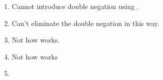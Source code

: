 \begin{enumerate}
\begin{enumerate}
\item 
\begin{argumentN}[1]



\end{argumentN}


\opts{

 \dotline
 \dotline
}
{Cannot introduce double negation using \negI.}

\item 
\begin{argumentN}[1]



\end{argumentN}

\opts{

 \dotline
 \dotline
}
{Can't eliminate the double negation in this way.}

\item

\begin{argumentN}[1]




\end{argumentN}

\opts{

 \dotline
 \dotline
}
{Not how \condE{} works.}

\item
\begin{argumentN}[1]



\end{argumentN}

\opts{

 \dotline
 \dotline
}
{Not how \condE{} works}

\item 
\begin{argumentN}[1]


\end{argumentN}
\end{enumerate}
\end{enumerate}
